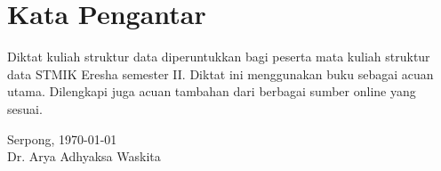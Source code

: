 \chapter*{Kata Pengantar}
Diktat kuliah struktur data diperuntukkan bagi peserta mata kuliah struktur data STMIK Eresha semester II. Diktat ini menggunakan buku \cite{adam2001data,group2005data} sebagai acuan utama. Dilengkapi juga acuan tambahan dari berbagai sumber online yang sesuai.

\vspace*{0.1cm}
\begin{flushright}
Serpong, \today\\[0.1cm]
\vspace*{1cm}
Dr. Arya Adhyaksa Waskita

\end{flushright}
